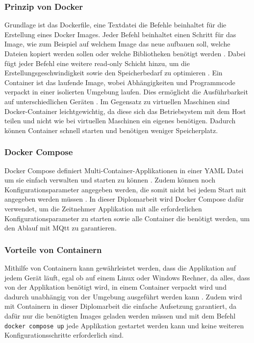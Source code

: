 \subsubsection{Prinzip von Docker}
Grundlage ist das Dockerfile, eine Textdatei die Befehle beinhaltet für die Erstellung eines Docker Images. Jeder Befehl beinhaltet einen Schritt für das Image, wie zum Beispiel auf welchem Image das neue aufbauen soll, welche Dateien kopiert werden sollen oder welche Bibliotheken benötigt werden \cite{what_is_a_dockerfile_spacelift}. Dabei fügt jeder Befehl eine weitere read-only Schicht hinzu, um die Erstellungsgeschwindigkeit sowie den Speicherbedarf zu optimieren \cite{geeksforgeeks_dockerfile}.
Ein Container ist das laufende Image, wobei Abhängigkeiten und Programmcode verpackt in einer isolierten Umgebung laufen. Dies ermöglicht die Ausführbarkeit auf unterschiedlichen Geräten \cite{geeksforgeeks_what_is_docker}.
Im Gegensatz zu virtuellen Maschinen sind Docker-Container leichtgewichtig, da diese sich das Betriebsystem mit dem Host teilen und nicht wie bei virtuellen Maschinen ein eigenes benötigen. Dadurch können Container schnell starten und benötigen weniger Speicherplatz. \cite{geekflare_lightweight_container} 

\subsubsection{Docker Compose}
Docker Compose definiert Multi-Container-Applikationen in einer YAML Datei um sie einfach verwalten und starten zu können \cite{dev_to_docker_compose}. Zudem können noch Konfigurationsparameter angegeben werden, die somit nicht bei jedem Start mit angegeben werden müssen \cite{docker_what_is_docker_compose}. In dieser Diplomarbeit wird Docker Compose dafür verwendet, um die Zeitnehmer Applikation mit alle erforderlichen Konfigurationsparameter zu starten sowie alle Container die benötigt werden, um den Ablauf mit MQtt zu garantieren.


\subsubsection{Vorteile von Containern}
Mithilfe von Containern kann gewährleistet werden, dass die Applikation auf jedem Gerät läuft, egal ob auf einem Linux oder Windows Rechner, da alles, dass von der Applikation benötigt wird, in einem Container verpackt wird und dadurch unabhängig von der Umgebung ausgeführt werden kann \cite{advantages_of_docker_cantech}.
Zudem wird mit Containern in dieser Diplomarbeit die einfache Aufsetzung garantiert, da dafür nur die benötigten Images geladen werden müssen und mit dem Befehl \texttt{docker compose up} jede Applikation gestartet werden kann und keine weiteren Konfigurationsschritte erforderlich sind.

